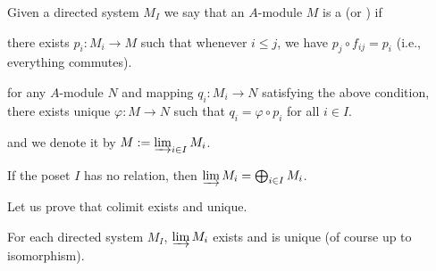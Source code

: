 \begin{definition}[Colimit]
    Given a directed system $M_I$ we say that an $A$-module
    $M$ is a  (or )
    if 
    \begin{alphenum}
    \item there exists $p_i : M_i\to M$ such that
	whenever $i\leq j$, we have $p_j\circ f_{ij} = p_i$
	(i.e., everything commutes).
    \item for any $A$-module $N$ and mapping
	$q_i : M_i\to N$ satisfying the above condition,
	there exists unique $\varphi : M\to N$
	such that $q_i = \varphi \circ p_i$ for all $i\in I$.
    \begin{center}
    \end{center}
    \end{alphenum}
    and we denote it by $M := \varinjlim_{i\in I} M_i$.
\end{definition}
\begin{example}
    If the poset $I$ has no relation,
    then $\varinjlim M_i = \bigoplus_{i\in I} M_i$.
\end{example}
Let us prove that colimit exists and unique.
\begin{proposition}
    For each directed system $M_I$,  $\varinjlim M_i$ exists and is  unique
    (of course up to isomorphism).
\end{proposition}
